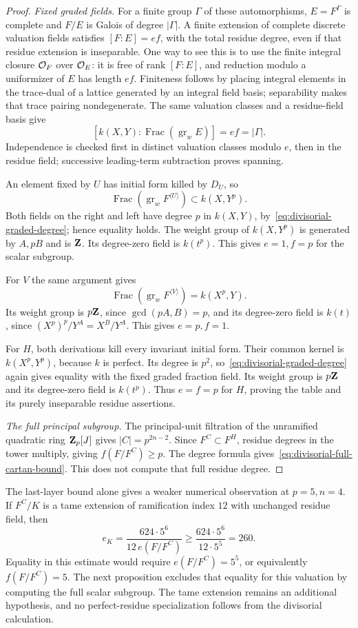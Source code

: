 \begin{proof}
\emph{Fixed graded fields.}
For a finite group $\Gamma$ of these automorphisms, $E=F^\Gamma$ is complete and $F/E$ is Galois of degree $|\Gamma|$. A finite extension of complete discrete valuation fields satisfies $[F:E]=ef$, with the total residue degree, even if that residue extension is inseparable. One way to see this is to use the finite integral closure $\mathcal O_F$ over $\mathcal O_E$: it is free of rank $[F:E]$, and reduction modulo a uniformizer of $E$ has length $ef$. Finiteness follows by placing integral elements in the trace-dual of a lattice generated by an integral field basis; separability makes that trace pairing nondegenerate. The same valuation classes and a residue-field basis give
\begin{equation}\label{eq:divisorial-graded-degree}
 [k(X,Y):\operatorname{Frac}(\operatorname{gr}_w E)]=ef=|\Gamma|.
\end{equation}
Independence is checked first in distinct valuation classes modulo $e$, then in the residue field; successive leading-term subtraction proves spanning.

An element fixed by $U$ has initial form killed by $D_U$, so
\[
 \operatorname{Frac}(\operatorname{gr}_w F^{\langle U\rangle})
 \subset k(X,Y^p).
\]
Both fields on the right and left have degree $p$ in $k(X,Y)$, by~\eqref{eq:divisorial-graded-degree}; hence equality holds. The weight group of $k(X,Y^p)$ is generated by $A,pB$ and is $\mathbf Z$. Its degree-zero field is $k(t^p)$. This gives $e=1,f=p$ for the scalar subgroup.

For $V$ the same argument gives
\[
 \operatorname{Frac}(\operatorname{gr}_w F^{\langle V\rangle})
 =k(X^p,Y).
\]
Its weight group is $p\mathbf Z$, since $\gcd(pA,B)=p$, and its degree-zero field is $k(t)$, since $(X^p)^p/Y^A=X^B/Y^A$. This gives $e=p,f=1$.

For $H$, both derivations kill every invariant initial form. Their common kernel is $k(X^p,Y^p)$, because $k$ is perfect. Its degree is $p^2$, so~\eqref{eq:divisorial-graded-degree} again gives equality with the fixed graded fraction field. Its weight group is $p\mathbf Z$ and its degree-zero field is $k(t^p)$. Thus $e=f=p$ for $H$, proving the table and its purely inseparable residue assertions.

\emph{The full principal subgroup.}
The principal-unit filtration of the unramified quadratic ring $\mathbf Z_p[J]$ gives $|C|=p^{2n-2}$. Since $F^C\subset F^H$, residue degrees in the tower multiply, giving $f(F/F^C)\ge p$. The degree formula gives~\eqref{eq:divisorial-full-cartan-bound}. This does not compute that full residue degree.
\end{proof}

The last-layer bound alone gives a weaker numerical observation at $p=5,n=4$. If $F^C/K$ is a tame extension of ramification index $12$ with unchanged residue field, then
\[
 e_K=\frac{624\cdot5^6}{12\,e(F/F^C)}
 \ge\frac{624\cdot5^6}{12\cdot5^5}=260.
\]
Equality in this estimate would require $e(F/F^C)=5^5$, or equivalently $f(F/F^C)=5$. The next proposition excludes that equality for this valuation by computing the full scalar subgroup. The tame extension remains an additional hypothesis, and no perfect-residue specialization follows from the divisorial calculation.
